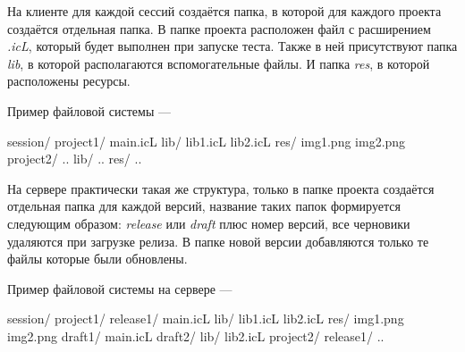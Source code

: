На клиенте для каждой сессий создаётся папка, в которой для каждого проекта создаётся отдельная папка. В папке проекта расположен файл с расширением {\it .icL}, который будет выполнен при запуске теста. Также в ней присутствуют папка {\it lib}, в которой располагаются вспомогательные файлы. И папка {\it res}, в которой расположены ресурсы.

Пример файловой системы —
\begin{jscode}
session/
	project1/
		main.icL
		lib/
			lib1.icL
			lib2.icL
		res/
			img1.png
			img2.png
		project2/
			..
			lib/
				..
			res/
				..
\end{jscode}

На сервере практически такая же структура, только в папке проекта создаётся отдельная папка для каждой версий, название таких папок формируется следующим образом: {\it release} или {\it draft} плюс номер версий, все черновики удаляются при загрузке релиза. В папке новой версии добавляются только те файлы которые были обновлены.

Пример файловой системы на сервере —

\begin{jscode}
session/
	project1/
		release1/
			main.icL
			lib/
				lib1.icL
				lib2.icL
			res/
				img1.png
				img2.png
		draft1/
			main.icL
		draft2/
			lib/
				lib2.icL
	project2/
		release1/
			..
\end{jscode}